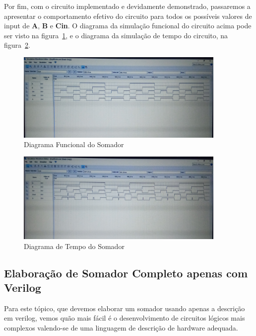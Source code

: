 \documentclass[12pt]{article}
\begin{document}
Por fim, com o circuito implementado e devidamente demonstrado, passaremos a
apresentar o comportamento efetivo do circuito para todos os possíveis valores
de input de \textbf{A}, \textbf{B} e \textbf{Cin}. O diagrama da simulação
funcional do circuito acima pode ser visto na
figura~\ref{fig:2_1_Functional_Foto.jpg}, e o diagrama da simulação de tempo do
circuito, na figura~\ref{fig:2_1_Timing_Foto.jpg}.

\begin{figure}[H]
  \centering
  \includegraphics[width=0.9\textwidth]{Exp06/Images/2_1_Functional_Foto.jpg}
  \caption{Diagrama Funcional do Somador}\label{fig:2_1_Functional_Foto.jpg}
\end{figure}

\begin{figure}[H]
  \centering
  \includegraphics[width=0.9\textwidth]{Exp06/Images/2_1_Timing_Foto.jpg}
  \caption{Diagrama de Tempo do Somador}\label{fig:2_1_Timing_Foto.jpg}
\end{figure}

\subsection{Elaboração de Somador Completo apenas com Verilog}\label{sec:2.2}

Para este tópico, que devemos elaborar um somador usando apenas a descrição em
verilog, vemos quão mais fácil é o desenvolvimento de circuitos lógicos mais
complexos valendo-se de uma linguagem de descrição de hardware adequada.
\end{document}
